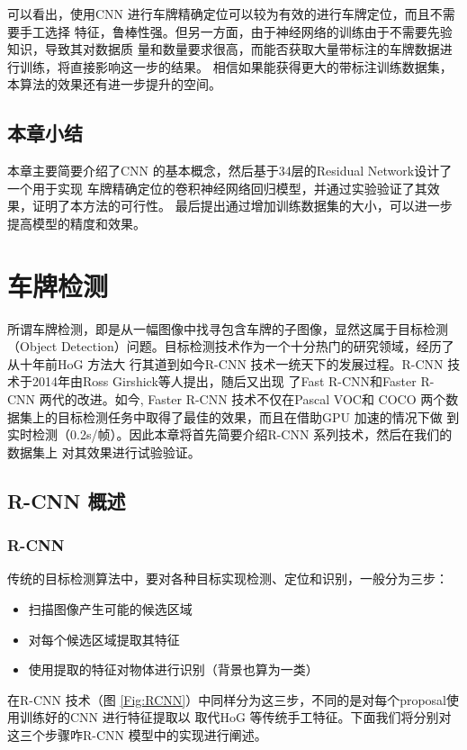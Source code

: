 可以看出，使用CNN 进行车牌精确定位可以较为有效的进行车牌定位，而且不需要手工选择
特征，鲁棒性强。但另一方面，由于神经网络的训练由于不需要先验知识，导致其对数据质
量和数量要求很高，而能否获取大量带标注的车牌数据进行训练，将直接影响这一步的结果。
相信如果能获得更大的带标注训练数据集，本算法的效果还有进一步提升的空间。

\section{本章小结}

本章主要简要介绍了CNN 的基本概念，然后基于34层的Residual Network设计了一个用于实现
车牌精确定位的卷积神经网络回归模型，并通过实验验证了其效果，证明了本方法的可行性。
最后提出通过增加训练数据集的大小，可以进一步提高模型的精度和效果。

\chapter{车牌检测}

所谓车牌检测，即是从一幅图像中找寻包含车牌的子图像，显然这属于目标检测（Object
Detection）问题。目标检测技术作为一个十分热门的研究领域，经历了从十年前HoG 方法大
行其道到如今R-CNN 技术一统天下的发展过程。R-CNN 技术于2014年由Ross Girshick等人提出，随后又出现
了Fast R-CNN和Faster R-CNN 两代的改进。如今, Faster R-CNN 技术不仅在Pascal VOC和
COCO 两个数据集上的目标检测任务中取得了最佳的效果，而且在借助GPU 加速的情况下做
到实时检测（0.2s/帧）。因此本章将首先简要介绍R-CNN 系列技术，然后在我们的数据集上
对其效果进行试验验证。

\section{R-CNN 概述}

\subsection{R-CNN}

传统的目标检测算法中，要对各种目标实现检测、定位和识别，一般分为三步：

\begin{itemize}
  \item 扫描图像产生可能的候选区域
  \item 对每个候选区域提取其特征
  \item 使用提取的特征对物体进行识别（背景也算为一类）
\end{itemize}

在R-CNN 技术（图 \ref{Fig:RCNN}）中同样分为这三步，不同的是对每个proposal使用训练好的CNN 进行特征提取以
取代HoG 等传统手工特征。下面我们将分别对这三个步骤咋R-CNN 模型中的实现进行阐述。

